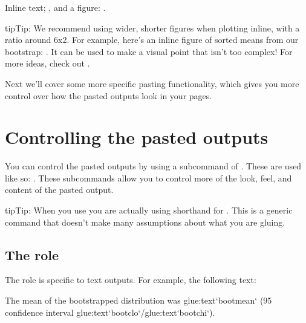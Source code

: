 \documentclass[letterpaper,10pt,english]{jupyterBook}
\begin{document}
\sphinxAtStartPar
In\sphinxhyphen{}line text; , and a figure: .

\begin{sphinxadmonition}{tip}{Tip:}
\sphinxAtStartPar
We recommend using wider, shorter figures when plotting in\sphinxhyphen{}line, with a ratio
around 6x2. For example, here’s an in\sphinxhyphen{}line figure of sorted means
from our bootstrap: .
It can be used to make a visual point that isn’t too complex! For more
ideas, check out .
\end{sphinxadmonition}

\sphinxAtStartPar
Next we’ll cover some more specific pasting functionality, which gives you more
control over how the pasted outputs look in your pages.


\section{Controlling the pasted outputs}
\label{\detokenize{overview:controlling-the-pasted-outputs}}
\sphinxAtStartPar
You can control the pasted outputs by using a sub\sphinxhyphen{}command of . These are used like so:
. These subcommands allow you to control more of the look, feel, and
content of the pasted output.

\begin{sphinxadmonition}{tip}{Tip:}
\sphinxAtStartPar
When you use  you are actually using shorthand for . This is a
generic command that doesn’t make many assumptions about what you are gluing.
\end{sphinxadmonition}


\subsection{The  role}
\label{\detokenize{overview:the-glue-text-role}}
\sphinxAtStartPar
The  role is specific to text outputs.
For example, the following text:

\begin{sphinxVerbatim}[commandchars=\\\{\}]
The mean of the bootstrapped distribution was \PYGZob{}glue:text\PYGZcb{}`boot\PYGZus{}mean` (95\PYGZpc{} confidence interval \PYGZob{}glue:text\PYGZcb{}`boot\PYGZus{}clo`/\PYGZob{}glue:text\PYGZcb{}`boot\PYGZus{}chi`).
\end{sphinxVerbatim}
\end{document}
